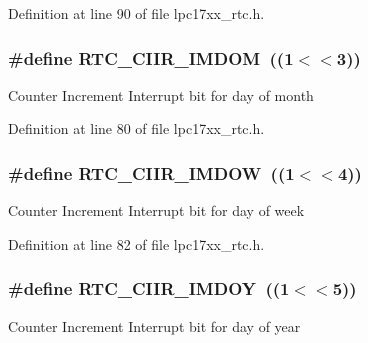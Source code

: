 \-Definition at line 90 of file lpc17xx\-\_\-rtc.\-h.

\hypertarget{group___r_t_c___private___macros_gaf55c5b7bf137cd55391e82b52a48fd12}{
\subsubsection[{\-R\-T\-C\-\_\-\-C\-I\-I\-R\-\_\-\-I\-M\-D\-O\-M}]{\setlength{\rightskip}{0pt plus 5cm}\#define {\bf \-R\-T\-C\-\_\-\-C\-I\-I\-R\-\_\-\-I\-M\-D\-O\-M}~((1$<$$<$3))}}\label{group___r_t_c___private___macros_gaf55c5b7bf137cd55391e82b52a48fd12}
\-Counter \-Increment \-Interrupt bit for day of month 

\-Definition at line 80 of file lpc17xx\-\_\-rtc.\-h.

\hypertarget{group___r_t_c___private___macros_ga4a85d9ccd503abc66287eadfd7812279}{
\subsubsection[{\-R\-T\-C\-\_\-\-C\-I\-I\-R\-\_\-\-I\-M\-D\-O\-W}]{\setlength{\rightskip}{0pt plus 5cm}\#define {\bf \-R\-T\-C\-\_\-\-C\-I\-I\-R\-\_\-\-I\-M\-D\-O\-W}~((1$<$$<$4))}}\label{group___r_t_c___private___macros_ga4a85d9ccd503abc66287eadfd7812279}
\-Counter \-Increment \-Interrupt bit for day of week 

\-Definition at line 82 of file lpc17xx\-\_\-rtc.\-h.

\hypertarget{group___r_t_c___private___macros_ga772e6a50392b61d1650f2372b31be99e}{
\subsubsection[{\-R\-T\-C\-\_\-\-C\-I\-I\-R\-\_\-\-I\-M\-D\-O\-Y}]{\setlength{\rightskip}{0pt plus 5cm}\#define {\bf \-R\-T\-C\-\_\-\-C\-I\-I\-R\-\_\-\-I\-M\-D\-O\-Y}~((1$<$$<$5))}}\label{group___r_t_c___private___macros_ga772e6a50392b61d1650f2372b31be99e}
\-Counter \-Increment \-Interrupt bit for day of year 

